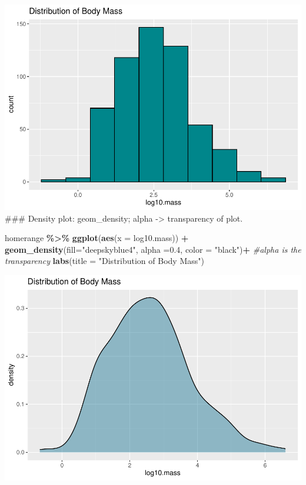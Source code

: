 \documentclass[
]{article}
\newenvironment{Shaded}{\begin{snugshade}}{\end{snugshade}}
\newcommand{\AttributeTok}[1]{\textcolor[rgb]{0.13,0.29,0.53}{#1}}
\newcommand{\CommentTok}[1]{\textcolor[rgb]{0.56,0.35,0.01}{\textit{#1}}}
\newcommand{\FloatTok}[1]{\textcolor[rgb]{0.00,0.00,0.81}{#1}}
\newcommand{\FunctionTok}[1]{\textcolor[rgb]{0.13,0.29,0.53}{\textbf{#1}}}
\newcommand{\NormalTok}[1]{#1}
\newcommand{\SpecialCharTok}[1]{\textcolor[rgb]{0.81,0.36,0.00}{\textbf{#1}}}
\newcommand{\StringTok}[1]{\textcolor[rgb]{0.31,0.60,0.02}{#1}}
\begin{document}
\includegraphics{Untitled_files/figure-latex/unnamed-chunk-36-1.pdf}
\#\#\# Density plot: geom\_density; alpha -\textgreater{} transparency
of plot.

\begin{Shaded}
\begin{Highlighting}[]
\NormalTok{homerange }\SpecialCharTok{\%\textgreater{}\%} 
  \FunctionTok{ggplot}\NormalTok{(}\FunctionTok{aes}\NormalTok{(}\AttributeTok{x =}\NormalTok{ log10.mass)) }\SpecialCharTok{+}
  \FunctionTok{geom\_density}\NormalTok{(}\AttributeTok{fill=}\StringTok{"deepskyblue4"}\NormalTok{, }\AttributeTok{alpha  =}\FloatTok{0.4}\NormalTok{, }\AttributeTok{color =} \StringTok{"black"}\NormalTok{)}\SpecialCharTok{+} \CommentTok{\#alpha is the transparency}
  \FunctionTok{labs}\NormalTok{(}\AttributeTok{title =} \StringTok{"Distribution of Body Mass"}\NormalTok{)}
\end{Highlighting}
\end{Shaded}

\includegraphics{Untitled_files/figure-latex/unnamed-chunk-37-1.pdf}
\end{document}

